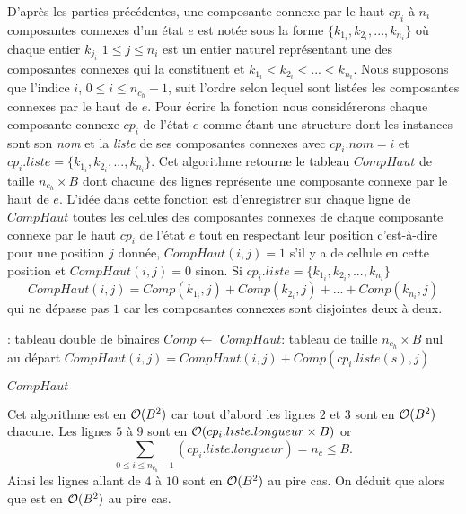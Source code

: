   D'après les parties  précédentes, une composante connexe par le haut $cp_{i}$  à $n_{i}$ composantes connexes  d'un état $e$ est notée sous la  forme $\{k_{1_{i}}, k_{2_{i}},...,k_{n_{i}}\}$ où chaque entier $k_{j_{i}}$ $1\leq j\leq n_{i}$ est un entier naturel représentant une des composantes connexes qui la constituent et $k_{1_{i}}<k_{2_{i}}<...<k_{n_{i}}$. Nous supposons que l'indice $i$, $0\leq i\leq n_{c_{h}}-1$, suit l'ordre  selon lequel sont listées les composantes connexes  par le haut de $e$. Pour écrire la fonction  nous  considérerons chaque composante connexe  $cp_{i}$ de l'état $e$ comme étant une structure dont les instances sont son \emph{nom} et la \emph{liste} de ses composantes connexes avec $cp_{i}.nom=i$  et $cp_{i}.liste=\{k_{1_{i}}, k_{2_{i}},...,k_{n_{i}}\}$. Cet algorithme retourne le tableau $CompHaut$ de taille $n_{c_{h}}\times B$ dont chacune des lignes  représente une composante connexe par le haut de $e$. L'idée dans cette fonction est d'enregistrer sur chaque ligne de $CompHaut$ toutes les cellules des composantes connexes de chaque composante connexe par le haut $cp_{i}$ de l'état $e$  tout en respectant leur position c'est-à-dire  pour une position $j$ donnée, $CompHaut(i,j)=1$ s'il y a de cellule en cette position et $CompHaut(i,j)=0$ sinon. Si $cp_{i}.liste=\{k_{1_{i}}, k_{2_{i}},...,k_{n_{i}}\}$
  $$CompHaut(i,j)=Comp(k_{1_{i}},j)+Comp(k_{2_{i}},j) +...+Comp(k_{n_{i}},j)$$
 qui ne dépasse pas $1$ car les composantes connexes sont disjointes deux à deux. 
  \begin{algorithmic}[1]
      : tableau double de binaires
      \State $Comp \leftarrow $ 
      \State $CompHaut$: tableau de taille $n_{c_{h}}\times B$ nul au départ
                   \State $CompHaut(i,j) = CompHaut(i,j) +Comp(cp_{i}.liste(s),j) $
               \EndFor
         \EndFor
      
      \EndFor
      
    \State \Return $ CompHaut$
   \EndFunction
  \end{algorithmic}
  
  Cet algorithme est en $\mathcal{O} (B^{2})$  car tout d'abord les lignes $2$ et $3$ sont en $\mathcal{O} (B^{2})$  chacune. Les lignes $5$  à $9$  sont en $\mathcal{O}( cp_{i}.liste.longueur\times B)$ or $$\displaystyle \sum_{0\leq i\leq n_{c_{h}}-1}(cp_{i}.liste.longueur) = n_{c}\leq B.$$ Ainsi les lignes allant de $4$ à $10$ sont en $\mathcal{O} (B^{2})$ au pire cas. On déduit que alors que  est en $\mathcal{O} (B^{2})$ au pire cas.
